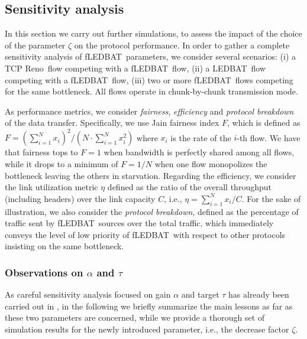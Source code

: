 \documentclass[conference]{IEEEtran}
\newcommand{\reno}[0]{TCP Reno}
\newcommand{\btledbat}[0]{LEDBAT}
\newcommand{\fledbat}[0]{fLEDBAT}
\begin{document}
\subsection{Sensitivity analysis}\label{sec:sensitivity}


In this section we carry out further simulations, to assess the impact of the
choice of the parameter $\zeta$ on the protocol performance.
In order to gather a complete sensitivity analysis of \fledbat\ parameters,
we consider several scenarios: (i) a \reno\ flow competing with a
\fledbat\ flow, (ii) a \btledbat\ flow competing with a \fledbat\ flow, (iii) two or more \fledbat\ flows competing for the same bottleneck. All flows operate in chunk-by-chunk transmission mode.


As performance metrics, we consider \emph{fairness}, \emph{efficiency} and \emph{protocol breakdown} of
the data transfer. Specifically, we use Jain fairness index $F$, which is
defined as $F =( \sum_{i=1}^N x_i )^2 /( N \cdot \sum_{i=1}^N x_i^2 )$ where $x_i $ is the rate of the $i$-th flow. We have that fairness tops to $F=1$ when bandwidth is perfectly shared among all flows, while it drops to a minimum of $F=1/N$ when one flow monopolizes the bottleneck leaving the others in starvation. Regarding the efficiency, we consider the link utilization metric $\eta$ defined as the ratio of the overall throughput (including headers) over the link capacity $C$, i.e., $\eta=\sum_{i=1}^N x_i / C$. For the sake of illustration, we also consider the \emph{protocol breakdown}, defined as the percentage of traffic sent by \fledbat\ sources over the total traffic, which immediately conveys the level of low priority of \fledbat\ with respect to other protocols insisting on the same bottleneck.


\subsubsection{Observations on $\alpha$ and $\tau$}

As careful sensitivity analysis focused on gain $\alpha$ and target $\tau$ has already been carried out in \cite{lcn10}, 
in the following we briefly summarize the main lessons as far as these two parameters are concerned, while we provide a thorough set of simulation results for the newly introduced parameter, i.e., the decrease factor $\zeta$.
\end{document}
